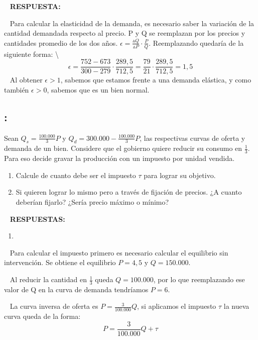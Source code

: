 \documentclass[
  letterpaper,
  DIV=11,
  numbers=noendperiod]{scrreport}
\providecommand{\tightlist}{%
  \setlength{\itemsep}{0pt}\setlength{\parskip}{0pt}}\usepackage{longtable,booktabs,array}
\begin{document}
~ \textbf{RESPUESTA:}

~ Para calcular la elasticidad de la demanda, es necesario saber la
variación de la cantidad demandada respecto al precio. P y Q se
reemplazan por los precios y cantidades promedio de los dos años.
\(\epsilon = \frac{\vartriangle Q}{\vartriangle P} \cdot \frac{P}{Q}\).
Reemplazando quedaría de la siguiente forma: \textbackslash{}
\[\epsilon = \frac{752 - 673}{300 - 279} \cdot \frac{289,5}{712,5} = \frac{79}{21} \cdot \frac{289,5}{712,5} = 1,5\]
~ Al obtener \(\epsilon > 1\), sabemos que estamos frente a una demanda
elástica, y como también \(\epsilon > 0\), sabemos que es un bien
normal.

\hypertarget{section-16}{%
\subsection{:}\label{section-16}}

Sean \(Q_s = \frac{100.000}{3} P\) y
\(Q_d = 300.000 - \frac{100.000}{3} P\), las respectivas curvas de
oferta y demanda de un bien. Considere que el gobierno quiere reducir su
consumo en \(\frac{1}{3}\). Para eso decide gravar la producción con un
impuesto por unidad vendida.

\begin{enumerate}
\def\labelenumi{\alph{enumi})}
\item
  Calcule de cuanto debe ser el impuesto \(\tau\) para lograr su
  objetivo.
\item
  Si quieren lograr lo mismo pero a través de fijación de precios. ¿A
  cuanto deberían fijarlo? ¿Sería precio máximo o mínimo?
\end{enumerate}

~ \textbf{RESPUESTAS:}

\begin{enumerate}
\def\labelenumi{\alph{enumi})}
\tightlist
\item
\end{enumerate}

~ Para calcular el impuesto primero es necesario calcular el equilibrio
sin intervención. Se obtiene el equilibrio \(P = 4,5\) y
\(Q = 150.000\).

~ Al reducir la cantidad en \(\frac{1}{3}\) queda \(Q=100.000\), por lo
que reemplazando ese valor de Q en la curva de demanda tendríamos
\(P=6\).

~ La curva inversa de oferta es \(P = \frac{3}{100.000}Q\), si aplicamos
el impuesto \(\tau\) la nueva curva queda de la forma:
\[P = \frac{3}{100.000}Q + \tau\]
\end{document}
